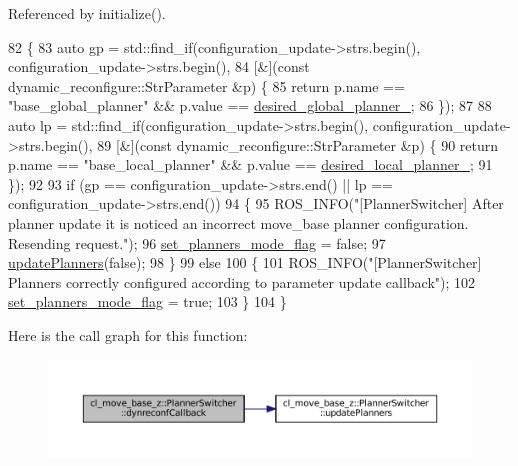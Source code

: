Referenced by initialize().


\begin{DoxyCode}
82 \{
83   \textcolor{keyword}{auto} gp = std::find\_if(configuration\_update->strs.begin(), configuration\_update->strs.begin(),
84                          [&](\textcolor{keyword}{const} dynamic\_reconfigure::StrParameter &p) \{
85                            \textcolor{keywordflow}{return} p.name == \textcolor{stringliteral}{"base\_global\_planner"} && p.value == 
      \hyperlink{classcl__move__base__z_1_1PlannerSwitcher_aef047d3778b2993c1df146bbad43e03d}{desired\_global\_planner\_};
86                          \});
87 
88   \textcolor{keyword}{auto} lp = std::find\_if(configuration\_update->strs.begin(), configuration\_update->strs.begin(),
89                          [&](\textcolor{keyword}{const} dynamic\_reconfigure::StrParameter &p) \{
90                            \textcolor{keywordflow}{return} p.name == \textcolor{stringliteral}{"base\_local\_planner"} && p.value == 
      \hyperlink{classcl__move__base__z_1_1PlannerSwitcher_a6cbf65f11bb69125f913caaabdf7b4cf}{desired\_local\_planner\_};
91                          \});
92 
93   \textcolor{keywordflow}{if} (gp == configuration\_update->strs.end() || lp == configuration\_update->strs.end())
94   \{
95     ROS\_INFO(\textcolor{stringliteral}{"[PlannerSwitcher] After planner update it is noticed an incorrect move\_base planner
       configuration. Resending request."});
96     \hyperlink{classcl__move__base__z_1_1PlannerSwitcher_a6c14fd001513787ed213704e2d3dc383}{set\_planners\_mode\_flag} = \textcolor{keyword}{false};
97     \hyperlink{classcl__move__base__z_1_1PlannerSwitcher_a146641f63aea3185daab4c5cbb789550}{updatePlanners}(\textcolor{keyword}{false});
98   \}
99   \textcolor{keywordflow}{else}
100   \{
101     ROS\_INFO(\textcolor{stringliteral}{"[PlannerSwitcher] Planners correctly configured according to parameter update callback"});
102     \hyperlink{classcl__move__base__z_1_1PlannerSwitcher_a6c14fd001513787ed213704e2d3dc383}{set\_planners\_mode\_flag} = \textcolor{keyword}{true};
103   \}
104 \}
\end{DoxyCode}
Here is the call graph for this function\+:
\nopagebreak
\begin{figure}[H]
\begin{center}
\leavevmode
\includegraphics[width=350pt]{classcl__move__base__z_1_1PlannerSwitcher_ad9371bd8d62600ef874e8914c3ec177b_cgraph}
\end{center}
\end{figure}
